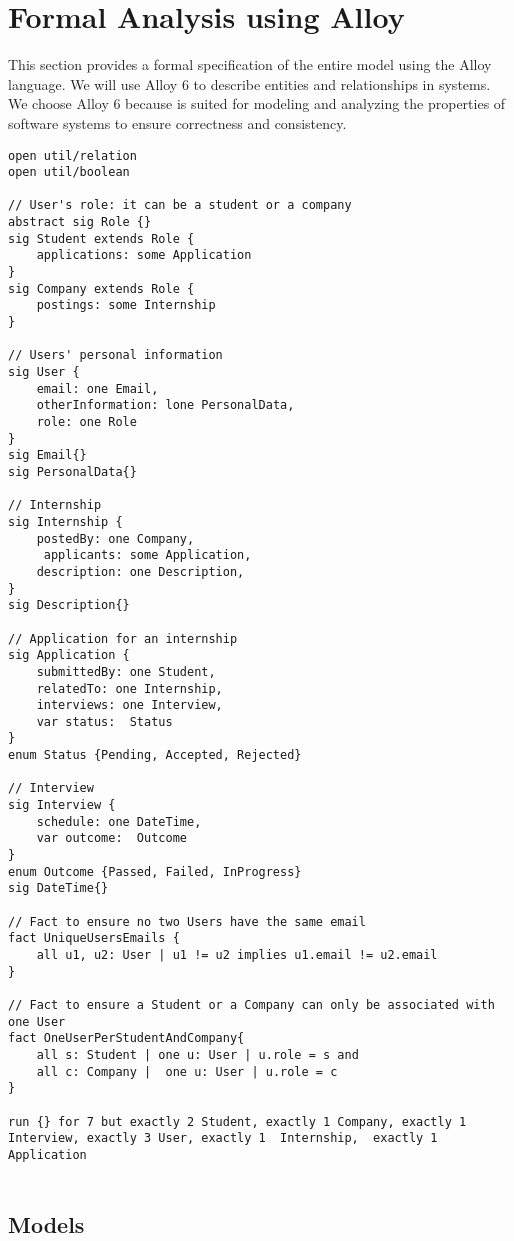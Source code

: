 \chapter{Formal Analysis using Alloy}
This section provides a formal specification of the entire model using the Alloy language. We will use Alloy 6 to describe entities and relationships in systems. We choose Alloy 6 because is suited for modeling and analyzing the properties of software systems to ensure correctness and consistency.

\begin{lstlisting}
open util/relation
open util/boolean

// User's role: it can be a student or a company
abstract sig Role {}
sig Student extends Role {
    applications: some Application
}
sig Company extends Role {
    postings: some Internship
}

// Users' personal information
sig User {
    email: one Email,
    otherInformation: lone PersonalData,
    role: one Role
}
sig Email{}
sig PersonalData{}

// Internship
sig Internship {
    postedBy: one Company,
     applicants: some Application,
    description: one Description,
}
sig Description{}

// Application for an internship
sig Application {
    submittedBy: one Student,
    relatedTo: one Internship,
    interviews: one Interview,
    var status:  Status
}
enum Status {Pending, Accepted, Rejected}

// Interview
sig Interview {
    schedule: one DateTime,
    var outcome:  Outcome
}
enum Outcome {Passed, Failed, InProgress}
sig DateTime{}

// Fact to ensure no two Users have the same email
fact UniqueUsersEmails {
    all u1, u2: User | u1 != u2 implies u1.email != u2.email
}

// Fact to ensure a Student or a Company can only be associated with one User
fact OneUserPerStudentAndCompany{
    all s: Student | one u: User | u.role = s and
    all c: Company |  one u: User | u.role = c
}

run {} for 7 but exactly 2 Student, exactly 1 Company, exactly 1 Interview, exactly 3 User, exactly 1  Internship,  exactly 1  Application


\end{lstlisting}


\section{ Models}